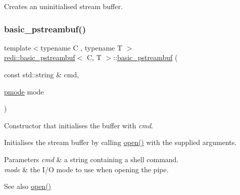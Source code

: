 Creates an uninitialised stream buffer.\mbox{\label{classredi_1_1basic__pstreambuf_aff497d97764d0917274d3a3f775bbe0c}} 
\subsubsection{\texorpdfstring{basic\+\_\+pstreambuf()}{basic\_pstreambuf()}\hspace{0.1cm}{\footnotesize\ttfamily [2/3]}}
{\footnotesize\ttfamily template$<$typename C , typename T $>$ \\
\mbox{\hyperlink{classredi_1_1basic__pstreambuf}{redi\+::basic\+\_\+pstreambuf}}$<$ C, T $>$\+::\mbox{\hyperlink{classredi_1_1basic__pstreambuf}{basic\+\_\+pstreambuf}} (\begin{DoxyParamCaption}\item[{const std\+::string \&}]{cmd,  }\item[{\mbox{\hyperlink{structredi_1_1pstreams_a1eae4aad88812af03a0fbb3ec13c50b7}{pmode}}}]{mode }\end{DoxyParamCaption})\hspace{0.3cm}{\ttfamily [inline]}}



Constructor that initialises the buffer with {\itshape cmd}. 

Initialises the stream buffer by calling \mbox{\hyperlink{classredi_1_1basic__pstreambuf_ac91e4317d9e95b4551513a00e3d82996}{open()}} with the supplied arguments.


\begin{DoxyParams}{Parameters}
{\em cmd} & a string containing a shell command. \\
\hline
{\em mode} & the I/O mode to use when opening the pipe. \\
\hline
\end{DoxyParams}
\begin{DoxySeeAlso}{See also}
\mbox{\hyperlink{classredi_1_1basic__pstreambuf_ac91e4317d9e95b4551513a00e3d82996}{open()}} 
\end{DoxySeeAlso}
\mbox{\label{classredi_1_1basic__pstreambuf_a7d5196b0eeb2747e77558f237c9ea185}} 
